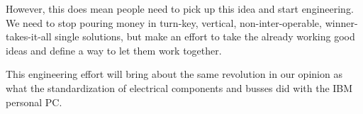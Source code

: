\documentclass{article}
\begin{document}
However, this does mean people need to pick up this idea and start engineering. We need to stop pouring money in turn-key, vertical, non-inter-operable, winner-takes-it-all single solutions, but make an effort to take the already working good ideas and define a way to let them work together. 

This engineering effort will bring about the same revolution in our opinion as what the standardization of electrical components and busses did with the IBM personal PC.



\end{document}
